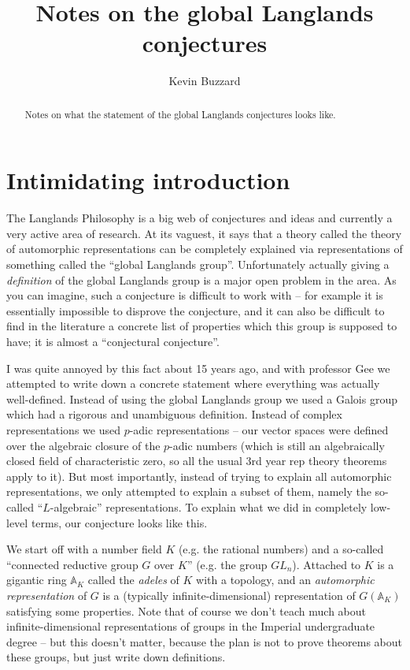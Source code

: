 \documentclass{amsart}
\begin{document}
\title{Notes on the global Langlands conjectures}
\author{Kevin Buzzard}
\address{Department of Mathematics, Imperial College London}
\begin{abstract}
  Notes on what the statement of the global Langlands conjectures looks like.
\end{abstract}

\section{Intimidating introduction}

The Langlands Philosophy is a big web of conjectures and ideas and currently a very active area of research. At its vaguest, it says that a theory called the theory of automorphic representations can be completely explained via representations of something called the ``global Langlands group''. Unfortunately actually giving a \emph{definition} of the global Langlands group is a major open problem in the area. As you can imagine, such a conjecture is difficult to work with -- for example it is essentially impossible to disprove the conjecture, and it can also be difficult to find in the literature a concrete list of properties which this group is supposed to have; it is almost a ``conjectural conjecture''.

I was quite annoyed by this fact about 15 years ago, and with professor Gee we attempted to write down a concrete statement where everything was actually well-defined. Instead of using the global Langlands group we used a Galois group which had a rigorous and unambiguous definition. Instead of complex representations we used $p$-adic representations -- our vector spaces were defined over the algebraic closure of the $p$-adic numbers (which is still an algebraically closed field of characteristic zero, so all the usual 3rd year rep theory theorems apply to it). But most importantly, instead of trying to explain all automorphic representations, we only attempted to explain a subset of them, namely the so-called ``$L$-algebraic'' representations. To explain what we did in completely low-level terms, our conjecture looks like this.

We start off with a number field $K$ (e.g. the rational numbers) and a so-called ``connected reductive group $G$ over $K$'' (e.g. the group $GL_n$). Attached to $K$ is a gigantic ring $\mathbb{A}_K$ called the \emph{adeles} of $K$ with a topology, and an \emph{automorphic representation} of $G$ is a (typically infinite-dimensional) representation of $G(\mathbb{A}_K)$ satisfying some properties. Note that of course we don't teach much about infinite-dimensional representations of groups in the Imperial undergraduate degree -- but this doesn't matter, because the plan is not to prove theorems about these groups, but just write down definitions.
\end{document}
